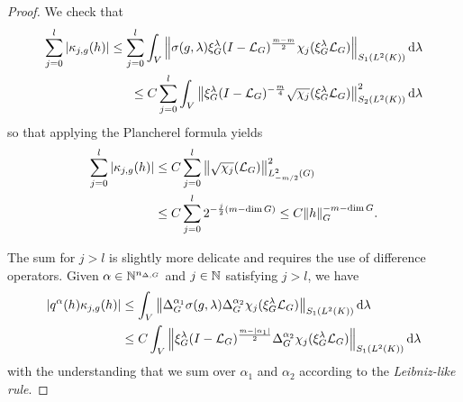 \begin{proof}
    We check that
    \begin{align*}
        \sum_{j = 0}^l \abs {\kappa_{j, g}(h)}
        \leq \sum_{j = 0}^l \int_\VectorSpace
        \norm [\SchattenClasses 1 {\Lebesgue 2 \CompactGroup}] {\sigma(g, \lambda) \Rep \lambda \BesselPotential {m - m} \chi_j(\Rep \lambda \Laplacian)} \dd \lambda\\
        \leq C \sum_{j = 0}^l \int_\VectorSpace
        \norm [\SchattenClasses 2 {\Lebesgue 2 \CompactGroup}] {\Rep \lambda \BesselPotentialSquared {-\frac m 4} \sqrt{\chi_j}(\Rep \lambda \Laplacian)}^2 \dd \lambda
    \end{align*}
    so that applying the Plancherel formula yields
    \begin{align}
        \sum_{j = 0}^l \abs {\kappa_{j, g}(h)}
        &\leq C \sum_{j = 0}^l
        \norm [\Sobolev {-m/2}] {\sqrt{\chi_j}(\Laplacian)}^2 \notag\\
        &\leq C \sum_{j = 0}^l 2^{- \frac j 2 (m - \dim \Group)}
        \leq C \norm [\Group] h^{-m - \dim \Group}.
        \label{eq:first_sum_in_Littlewood-Paley}
    \end{align}

    The sum for $j > l$ is slightly more delicate and requires the use of difference operators.
    Given $\alpha \in \N^{\dimDifferenceOperators}$ and $j \in \N$ satisfying $j > l$,
    we have
    \begin{align*}
        \abs {q^\alpha(h) \kappa_{j, g}(h)}
        &\leq
        \int_\VectorSpace
        \norm [\SchattenClasses 1 {\Lebesgue 2 \CompactGroup}] {\DifferenceOperatorOrder {\alpha_1} \sigma(g, \lambda) \DifferenceOperatorOrder {\alpha_2} \chi_j(\Rep \lambda \Laplacian)} \dd \lambda\\
        &\leq C
        \int_\VectorSpace
        \norm [\SchattenClasses 1 {\Lebesgue 2 \CompactGroup}] {\Rep \lambda \BesselPotential {m - \abs {\alpha_1}} \DifferenceOperatorOrder {\alpha_2} \chi_j(\Rep \lambda \Laplacian)} \dd \lambda
    \end{align*}
    with the understanding that we sum over $\alpha_1$ and $\alpha_2$ according to the \emph{Leibniz-like rule}.


\end{proof}
